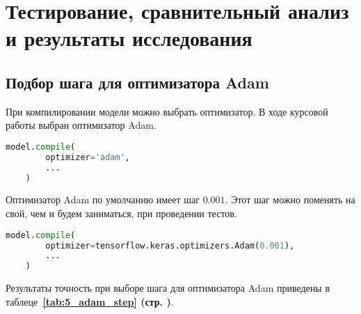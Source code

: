 \section{Тестирование, сравнительный анализ и результаты исследования}

\subsection{Подбор шага для оптимизатора Adam}

При компилировании модели можно выбрать оптимизатор. В ходе курсовой работы выбран оптимизатор Adam.

\begin{lstlisting}[language=Python]
    model.compile(
        optimizer='adam',
        ...
    )
\end{lstlisting}

Оптимизатор Adam по умолчанию имеет шаг $0.001$. Этот шаг можно поменять на свой, чем и будем заниматься, при проведении тестов.

\begin{lstlisting}[language=Python]
    model.compile(
        optimizer=tensorflow.keras.optimizers.Adam(0.001),
        ...
    )
\end{lstlisting}

Результаты точность при выборе шага для оптимизатора Adam приведены в
таблеце~\textbf{\ref{tab:5_adam_step} (стр. \pageref{tab:5_adam_step})}.

